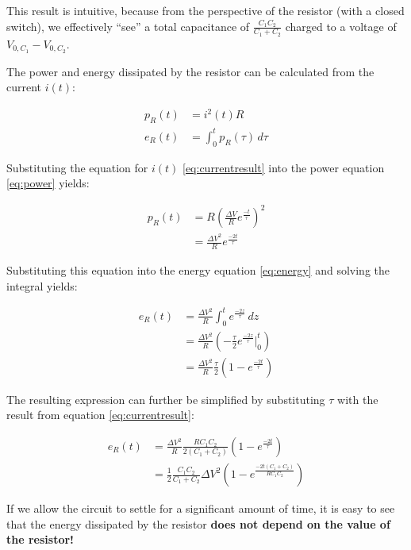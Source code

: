 This result is intuitive, because from the perspective of the resistor (with a
closed   switch),   we   effectively   ``see''   a   total    capacitance   of
$\frac{C_1C_2}{C_1+C_2}$  charged  to  a voltage of $V_{0,C_1}  -  V_{0,C_2}$.

The power and  energy  dissipated  by  the resistor can be calculated from the
current $i(t)$:

\begin{align}
    p_R(t) &= i^2(t) R \label{eq:power} \\
    e_R(t) &= \int_0^t p_R(\tau)\,d\tau \label{eq:energy}
\end{align}

Substituting  the equation for $i(t)$ \ref{eq:currentresult}  into  the  power
equation \ref{eq:power} yields:

\begin{align}
    p_R(t) &= R\left(\frac{\Delta V}{R} e^{\frac{-t}{\tau}}\right)^2 \\
           &= \frac{{\Delta V}^2}{R} e^{\frac{-2t}{\tau}}
\end{align}

Substituting  this  equation  into the  energy  equation  \ref{eq:energy}  and
solving the integral yields:

\begin{align}
    e_R(t) &= \frac{{\Delta V}^2}{R} \int_0^t e^{\frac{-2z}{\tau}}\,dz \\
           &= \frac{{\Delta V}^2}{R} \left(-\frac{\tau}{2} e^{\frac{-2z}{\tau}} \bigg|_0^t\right) \\
           &= \frac{{\Delta V}^2}{R} \frac{\tau}{2}\left(1 - e^{\frac{-2t}{\tau}}\right)
\end{align}

The resulting expression can further be simplified by substituting $\tau$ with
the result from equation \ref{eq:currentresult}:

\begin{align}
    e_R(t) &= \frac{{\Delta V}^2}{R} \frac{RC_1C_2}{2\left(C_1+C_2\right)}\left(1 - e^{\frac{-2t}{\tau}}\right) \\
           &= \frac{1}{2} \frac{C_1C_2}{C_1+C_2} {\Delta V}^2 \left(1 - e^{\frac{-2t\left(C_1+C_2\right)}{RC_1C_2}}\right)
\end{align}

If we allow the circuit to settle for a significant amount of time, it is easy
to see that  the  energy dissipated by the resistor \textbf{does not depend on
the value of the resistor!}

